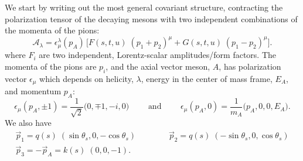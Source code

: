 \documentclass[10pt, aps,prd,amsmath,amssymb,superscriptaddress,onecolumn,
nofootinbib,showpacs,preprintnumbers]{revtex4-1}
\begin{document}
  We start by writing out the most general covariant structure, contracting the polarization tensor of the decaying mesons with two independent combinations of the momenta of the pions:
  \begin{equation}
    \label{eq:covariant}
    \mathcal{A}_\lambda = \epsilon_\mu^\lambda(p_A) \, \bigg[ F(s,t,u) \; (p_1 + p_2)^\mu + G(s,t,u) \;  (p_1 - p_2)^\mu \bigg].
    \end{equation}
where \(F_i\) are two independent, Lorentz-scalar amplitudes/form factors. The momenta of the pions are \(p_i\), and the axial vector meson, \(A\), has polarization vector \(\epsilon_\mu\) which depends on helicity, \(\lambda\), energy in the center of mass frame, \(E_A\), and momentum \(p_A\):
  \begin{equation}
    \label{eq:polarization}
    \epsilon_\mu(p_A, \pm1) = \frac{1}{\sqrt{2}} \big( 0, \mp 1, - i, 0 \big) \qquad \text{ and } \qquad \epsilon_\mu(p_A, 0) = \frac{1}{m_A} \big( p_A, 0, 0, E_A \big).
    \end{equation}
We also have
  \begin{gather}
    \vec{p}_1 = q(s) \; (\sin \theta_s, 0,  -\cos \theta_s) \qquad \qquad \vec{p}_2 = q(s) \; (-\sin \theta_s, 0 , \cos \theta_s ) \\
    \vec{p}_3 = - \vec{p}_A = k(s) \; (0,0,-1). \nonumber
  \end{gather}
\end{document}
